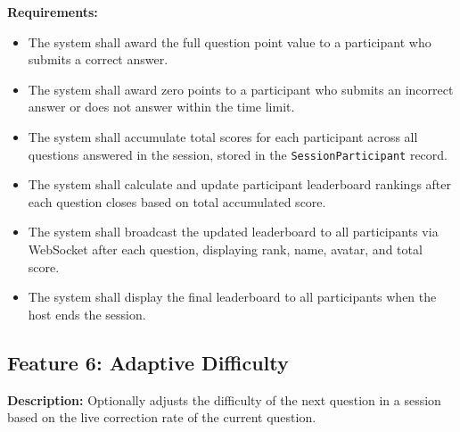 \documentclass[12pt,a4paper]{article}
\begin{document}
\textbf{Requirements:}
\begin{itemize}
  \item[\textbf{FR35:}] The system shall award the full question point value to a
        participant who submits a correct answer.
  \item[\textbf{FR36:}] The system shall award zero points to a participant who
        submits an incorrect answer or does not answer within the time limit.
  \item[\textbf{FR37:}] The system shall accumulate total scores for each participant
        across all questions answered in the session, stored in the
        \texttt{SessionParticipant} record.
  \item[\textbf{FR38:}] The system shall calculate and update participant leaderboard
        rankings after each question closes based on total accumulated score.
  \item[\textbf{FR39:}] The system shall broadcast the updated leaderboard to all
        participants via WebSocket after each question, displaying rank, name, avatar,
        and total score.
  \item[\textbf{FR40:}] The system shall display the final leaderboard to all
        participants when the host ends the session.
\end{itemize}

\subsection{Feature 6: Adaptive Difficulty}
\textbf{Description:} Optionally adjusts the difficulty of the next question in a
session based on the live correction rate of the current question.
\end{document}
